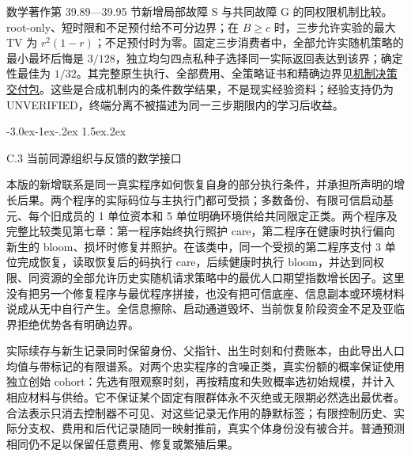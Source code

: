 \documentclass[
  11pt,
  oneside]{book}
\makeatletter
\renewcommand\section{\@startsection{section}{1}{\z@}%
  {-3.0ex\@plus-1ex\@minus-.2ex}%
  {1.5ex\@plus.2ex}%
  {\normalfont\Large\bfseries\raggedright\hyphenpenalty=10000\exhyphenpenalty=10000}}
\makeatother
\begin{document}
数学著作第 39.89---39.95 节新增局部故障 S 与共同故障 G 的同权限机制比较。root-only、短时限和不足预付给不可分边界；在 \(B\ge c\) 时，三步允许实验的最大 TV 为 \(r^2(1-r)\)；不足预付时为零。固定三步消费者中，全部允许实随机策略的最小最坏后悔是 \(3/128\)，独立均匀四点私种子选择同一实际返回表达到该界；确定性最佳为 \(1/32\)。其完整原生执行、全部费用、全策略证书和精确边界见\href{https://github.com/MurphyHoops/UEOT/blob/3d443ec29eb17af1fc00699a74e2d42d73516d81/formalization/ueot-core/docs/compression/theory_completion/unified_closure/mechanism_decision_closure_v1/README.md}{机制决策交付包}。这些是合成机制内的条件数学结果，不是现实经验资料；经验支持仍为 UNVERIFIED，终端分离不被描述为同一三步期限内的学习后收益。

\section{C.3 当前同源组织与反馈的数学接口}\label{ph-c-3}

本版的新增联系是同一真实程序如何恢复自身的部分执行条件，并承担所声明的增长后果。两个程序的实际码位与主执行门都可受损；多数备份、有限可信启动基元、每个旧成员的 1 单位资本和 5 单位明确环境供给共同限定正类。两个程序及完整比较类见第七章：第一程序始终执行照护 care，第二程序在健康时执行偏向新生的 bloom、损坏时修复并照护。在该类中，同一个受损的第二程序支付 3 单位完成恢复，读取恢复后的码执行 care，后续健康时执行 bloom，并达到同权限、同资源的全部允许历史实随机请求策略中的最优人口期望指数增长因子。这里没有把另一个修复程序与最优程序拼接，也没有把可信底座、信息副本或环境材料说成从无中自行产生。全信息擦除、启动通道毁坏、当前恢复阶段资金不足及亚临界拒绝优势各有明确边界。

实际续存与新生记录同时保留身份、父指针、出生时刻和付费账本，由此导出人口均值与带标记的有限谱系。对两个忠实程序的含噪正类，真实份额的概率保证使用独立创始 cohort：先选有限观察时刻，再按精度和失败概率选初始规模，并计入相应材料与供给。它不保证某个固定有限群体永不灭绝或无限期必然选出最优者。合法表示只消去控制器不可见、对这些记录无作用的静默标签；有限控制历史、实际分支权、费用和后代记录随同一映射推前，真实个体身份没有被合并。普通预测相同仍不足以保留任意费用、修复或繁殖后果。
\end{document}
